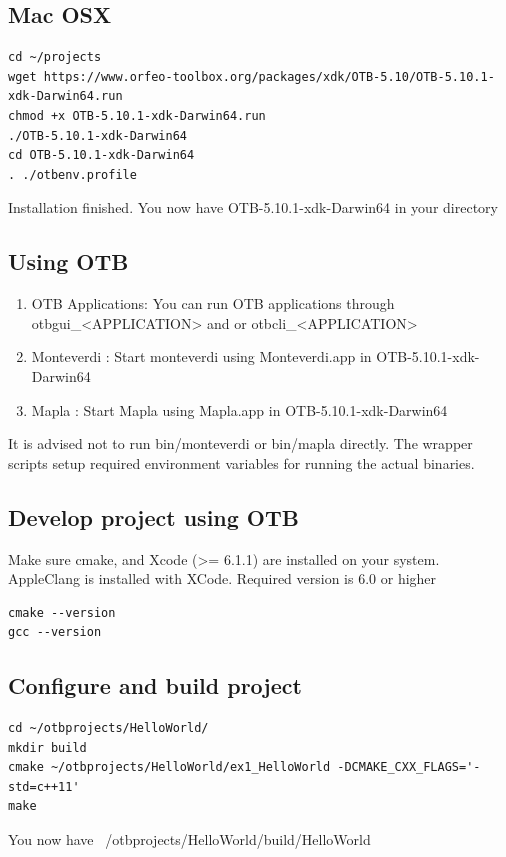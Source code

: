 \documentclass[10pt,a4paper]{article}
\begin{document}
\subsection{Mac OSX}

\begin{verbatim}
cd ~/projects
wget https://www.orfeo-toolbox.org/packages/xdk/OTB-5.10/OTB-5.10.1-xdk-Darwin64.run
chmod +x OTB-5.10.1-xdk-Darwin64.run
./OTB-5.10.1-xdk-Darwin64
cd OTB-5.10.1-xdk-Darwin64
. ./otbenv.profile
\end{verbatim}
Installation finished. You now have OTB-5.10.1-xdk-Darwin64 in your directory
\newline
\subsection{Using OTB}

\begin{enumerate}
\item OTB Applications: You can run OTB applications through otbgui\_<APPLICATION> and or otbcli\_<APPLICATION> 
\item Monteverdi : Start monteverdi using Monteverdi.app in OTB-5.10.1-xdk-Darwin64
\item Mapla : Start Mapla using Mapla.app in OTB-5.10.1-xdk-Darwin64
\end{enumerate}
It is advised not to run bin/monteverdi or bin/mapla directly.
\newline
The wrapper scripts setup required environment variables for running the actual binaries.
\newline

\subsection{Develop project using OTB}
Make sure cmake, and Xcode (>= 6.1.1) are installed on your system.
\newline
AppleClang is installed with XCode. Required version is 6.0 or higher
\newline
\begin{verbatim}
cmake --version
gcc --version
\end{verbatim}

\subsection{Configure and build project}

\begin{verbatim}
cd ~/otbprojects/HelloWorld/
mkdir build
cmake ~/otbprojects/HelloWorld/ex1_HelloWorld -DCMAKE_CXX_FLAGS='-std=c++11'
make
\end{verbatim}
You now have ~/otbprojects/HelloWorld/build/HelloWorld
\newline
\end{document}
